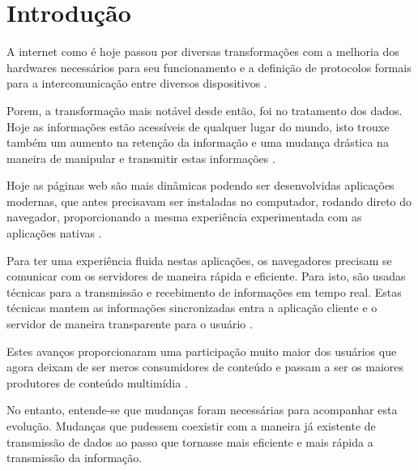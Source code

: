 \section{Introdução}


A internet como é hoje passou por diversas transformações com a melhoria dos hardwares necessários para seu funcionamento e a definição de protocolos formais para a intercomunicação entre diversos dispositivos \citep{Aghaei2012}.

Porem, a transformação mais notável desde então, foi no tratamento dos dados. Hoje as informações estão acessíveis de qualquer lugar do mundo, isto trouxe também um aumento na retenção da informação e uma mudança drástica na maneira de manipular e transmitir estas informações \citep{Leiner2009}.

Hoje as páginas web são mais dinâmicas podendo ser desenvolvidas aplicações modernas, que antes precisavam ser instaladas no computador, rodando direto do navegador,  proporcionando a mesma experiência experimentada com as aplicações nativas \citep{Garrett2005}.

Para ter uma experiência fluida nestas aplicações, os navegadores precisam se comunicar com os servidores de maneira rápida e eficiente. Para isto, são usadas técnicas para a transmissão e recebimento de informações em tempo real. Estas técnicas mantem as informações sincronizadas entra a aplicação cliente e o servidor de maneira transparente para o usuário \citep{offutt2002quality}.

Estes avanços proporcionaram uma participação muito maior dos usuários que agora deixam de ser meros consumidores de conteúdo e passam a ser os maiores produtores de conteúdo multimídia \citep{Aghaei2012}.

No entanto, entende-se que mudanças foram necessárias para acompanhar esta evolução. Mudanças que pudessem coexistir com a maneira já existente de transmissão de dados ao passo que tornasse mais eficiente e mais rápida a transmissão da informação.

